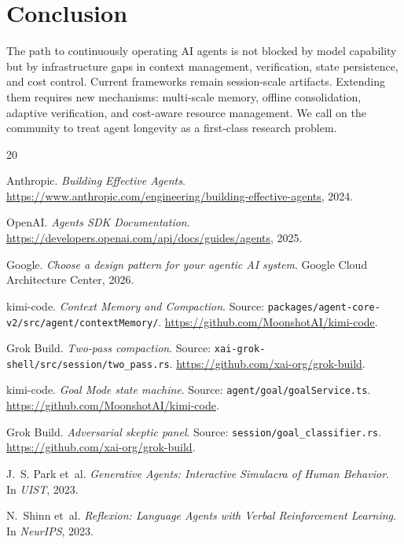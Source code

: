 \documentclass{article}
\begin{document}
\section{Conclusion}

The path to continuously operating AI agents is not blocked by model capability but by infrastructure gaps in context management, verification, state persistence, and cost control. Current frameworks remain session-scale artifacts. Extending them requires new mechanisms: multi-scale memory, offline consolidation, adaptive verification, and cost-aware resource management. We call on the community to treat agent longevity as a first-class research problem.


\begin{thebibliography}{20}

Anthropic. \emph{Building Effective Agents}. \url{https://www.anthropic.com/engineering/building-effective-agents}, 2024.

OpenAI. \emph{Agents SDK Documentation}. \url{https://developers.openai.com/api/docs/guides/agents}, 2025.

Google. \emph{Choose a design pattern for your agentic AI system}. Google Cloud Architecture Center, 2026.

kimi-code. \emph{Context Memory and Compaction}. Source: \texttt{packages/agent-core-v2/src/agent/contextMemory/}. \url{https://github.com/MoonshotAI/kimi-code}.

Grok Build. \emph{Two-pass compaction}. Source: \texttt{xai-grok-shell/src/session/two\_pass.rs}. \url{https://github.com/xai-org/grok-build}.

kimi-code. \emph{Goal Mode state machine}. Source: \texttt{agent/goal/goalService.ts}. \url{https://github.com/MoonshotAI/kimi-code}.

Grok Build. \emph{Adversarial skeptic panel}. Source: \texttt{session/goal\_classifier.rs}. \url{https://github.com/xai-org/grok-build}.

J.~S. Park et~al. \emph{Generative Agents: Interactive Simulacra of Human Behavior}. In \emph{UIST}, 2023.

N.~Shinn et~al. \emph{Reflexion: Language Agents with Verbal Reinforcement Learning}. In \emph{NeurIPS}, 2023.


\end{thebibliography}
\end{document}
